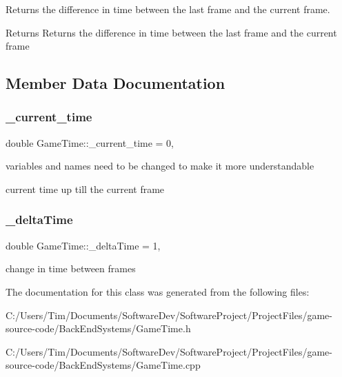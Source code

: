 Returns the difference in time between the last frame and the current frame. 

\begin{DoxyReturn}{Returns}
Returns the difference in time between the last frame and the current frame 
\end{DoxyReturn}


\subsection{Member Data Documentation}
\mbox{\label{class_game_time_a080d9deb72c675f0d68f9ad72eec66c3}} 
\subsubsection{\texorpdfstring{\+\_\+current\+\_\+time}{\_current\_time}}
{\footnotesize\ttfamily double Game\+Time\+::\+\_\+current\+\_\+time = 0\hspace{0.3cm}{\ttfamily [static]}, {\ttfamily [private]}}



variables and names need to be changed to make it more understandable 

current time up till the current frame \mbox{\label{class_game_time_a39c7a52db277a99fd6dfcb457b432d7d}} 
\subsubsection{\texorpdfstring{\+\_\+delta\+Time}{\_deltaTime}}
{\footnotesize\ttfamily double Game\+Time\+::\+\_\+delta\+Time = 1\hspace{0.3cm}{\ttfamily [static]}, {\ttfamily [private]}}

change in time between frames 

The documentation for this class was generated from the following files\+:\begin{DoxyCompactItemize}
\item 
C\+:/\+Users/\+Tim/\+Documents/\+Software\+Dev/\+Software\+Project/\+Project\+Files/game-\/source-\/code/\+Back\+End\+Systems/Game\+Time.\+h\item 
C\+:/\+Users/\+Tim/\+Documents/\+Software\+Dev/\+Software\+Project/\+Project\+Files/game-\/source-\/code/\+Back\+End\+Systems/Game\+Time.\+cpp\end{DoxyCompactItemize}
